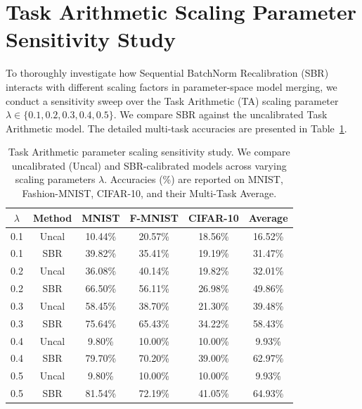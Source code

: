 \documentclass{article}
\theoremstyle{plain}
\theoremstyle{definition}
\theoremstyle{remark}
\begin{document}
\section{Task Arithmetic Scaling Parameter Sensitivity Study}
\label{app:lambda_sens}

To thoroughly investigate how Sequential BatchNorm Recalibration (SBR) interacts with different scaling factors in parameter-space model merging, we conduct a sensitivity sweep over the Task Arithmetic (TA) scaling parameter $\lambda \in \{0.1, 0.2, 0.3, 0.4, 0.5\}$. We compare SBR against the uncalibrated Task Arithmetic model. The detailed multi-task accuracies are presented in Table~\ref{tab:lambda_values}.

\begin{table}[h]
\caption{Task Arithmetic parameter scaling sensitivity study. We compare uncalibrated (Uncal) and SBR-calibrated models across varying scaling parameters $\lambda$. Accuracies (\%) are reported on MNIST, Fashion-MNIST, CIFAR-10, and their Multi-Task Average.}
\label{tab:lambda_values}
\vskip 0.15in
\begin{center}
\begin{small}
\begin{sc}
\begin{tabular}{cccccc}
\toprule
$\lambda$ & Method & MNIST & F-MNIST & CIFAR-10 & Average \\
\midrule
0.1 & Uncal & 10.44\% & 20.57\% & 18.56\% & 16.52\% \\
0.1 & SBR & 39.82\% & 35.41\% & 19.19\% & 31.47\% \\
\midrule
0.2 & Uncal & 36.08\% & 40.14\% & 19.82\% & 32.01\% \\
0.2 & SBR & 66.50\% & 56.11\% & 26.98\% & 49.86\% \\
\midrule
0.3 & Uncal & 58.45\% & 38.70\% & 21.30\% & 39.48\% \\
0.3 & SBR & 75.64\% & 65.43\% & 34.22\% & 58.43\% \\
\midrule
0.4 & Uncal & 9.80\% & 10.00\% & 10.00\% & 9.93\% \\
0.4 & SBR & 79.70\% & 70.20\% & 39.00\% & 62.97\% \\
\midrule
0.5 & Uncal & 9.80\% & 10.00\% & 10.00\% & 9.93\% \\
0.5 & SBR & 81.54\% & 72.19\% & 41.05\% & 64.93\% \\
\bottomrule
\end{tabular}
\end{sc}
\end{small}
\end{center}
\vskip -0.1in
\end{table}
\end{document}
